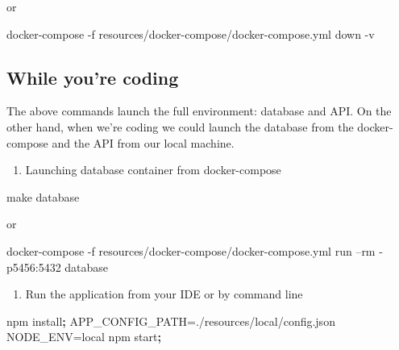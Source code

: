 \documentclass[]{book}
\newenvironment{Shaded}{\begin{snugshade}}{\end{snugshade}}
\newcommand{\KeywordTok}[1]{\textcolor[rgb]{0.13,0.29,0.53}{\textbf{#1}}}
\newcommand{\FunctionTok}[1]{\textcolor[rgb]{0.00,0.00,0.00}{#1}}
\newcommand{\VariableTok}[1]{\textcolor[rgb]{0.00,0.00,0.00}{#1}}
\newcommand{\ExtensionTok}[1]{#1}
\newcommand{\NormalTok}[1]{#1}
\providecommand{\tightlist}{%
  \setlength{\itemsep}{0pt}\setlength{\parskip}{0pt}}
\begin{document}
or

\begin{Shaded}
\begin{Highlighting}[]
\ExtensionTok{docker-compose}\NormalTok{ -f resources/docker-compose/docker-compose.yml down -v}
\end{Highlighting}
\end{Shaded}

\subsection{While you're coding}\label{while-youre-coding}

The above commands launch the full environment: database and API. On the
other hand, when we're coding we could launch the database from the
docker-compose and the API from our local machine.

\begin{enumerate}
\def\labelenumi{\arabic{enumi}.}
\tightlist
\item
  Launching database container from docker-compose
\end{enumerate}

\begin{Shaded}
\begin{Highlighting}[]
\FunctionTok{make}\NormalTok{ database}
\end{Highlighting}
\end{Shaded}

or

\begin{Shaded}
\begin{Highlighting}[]
\ExtensionTok{docker-compose}\NormalTok{ -f resources/docker-compose/docker-compose.yml run --rm -p5456:5432 database}
\end{Highlighting}
\end{Shaded}

\begin{enumerate}
\def\labelenumi{\arabic{enumi}.}
\setcounter{enumi}{1}
\tightlist
\item
  Run the application from your IDE or by command line
\end{enumerate}

\begin{Shaded}
\begin{Highlighting}[]
\ExtensionTok{npm}\NormalTok{ install}\KeywordTok{;}
\VariableTok{APP_CONFIG_PATH=}\NormalTok{./resources/local/config.json }\VariableTok{NODE_ENV=}\NormalTok{local }\ExtensionTok{npm}\NormalTok{ start}\KeywordTok{;}
\end{Highlighting}
\end{Shaded}
\end{document}
